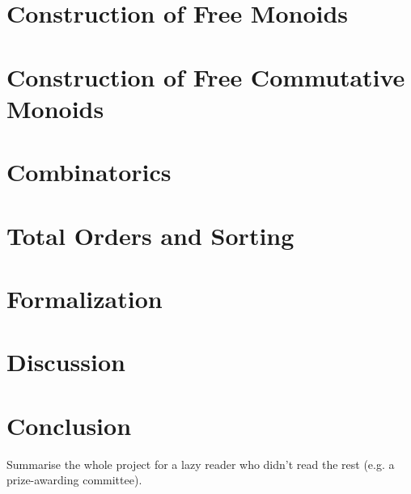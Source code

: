 \documentclass{l4proj}
\begin{document}
\chapter{Construction of Free Monoids}


\chapter{Construction of Free Commutative Monoids}


\chapter{Combinatorics}


\chapter{Total Orders and Sorting}


\chapter{Formalization}


\chapter{Discussion}


\chapter{Conclusion}    
Summarise the whole project for a lazy reader who didn't read the rest (e.g. a prize-awarding committee).
\end{document}
